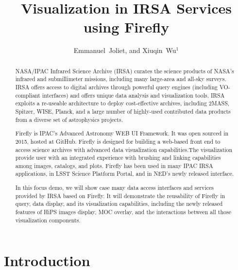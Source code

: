 \documentclass[11pt,twoside]{article}
\begin{document}
\title{Visualization in IRSA Services using Firefly}


\author{Emmanuel~Joliet, and Xiuqin~Wu$^1$}




\begin{abstract}

NASA/IPAC Infrared Science Archive (IRSA) curates the science products of NASA's infrared and submillimeter missions, including many large-area and all-sky surveys. IRSA offers access to digital archives through powerful query engines (including VO-compliant interfaces) and offers unique data analysis and visualization tools. IRSA exploits a re-useable architecture to deploy cost-effective archives, including 2MASS, Spitzer, WISE, Planck, and a large number of highly-used contributed data products from a diverse set of astrophysics projects.

Firefly is IPAC's Advanced Astronomy WEB UI Framework. It was  open sourced in 2015, hosted at GitHub. Firefly is designed for building a web-based front end to access science archives  with advanced data visualization capabilities.The visualization provide user with an integrated experience with brushing and linking capabilities among images, catalogs, and plots. Firefly has been used in many IPAC IRSA applications, in LSST Science Platform Portal, and in NED's newly released interface.

In this focus demo, we will show case many data access interfaces and services provided by IRSA based on Firefly. It will demonstrate the reusability of Firefly in query, data display, and its visualization capabilities, including the newly released features of HiPS images display, MOC overlay, and the interactions between all those visualization components.

\end{abstract}

\section{Introduction}
\end{document}
